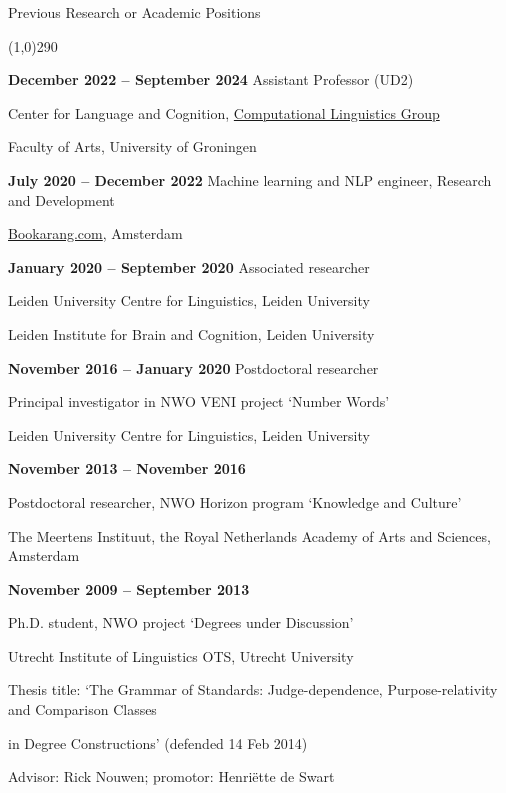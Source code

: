 \documentclass[12pt,letterpaper]{article}
\begin{document}
\noindent \Large{Previous Research or Academic Positions}

\vspace{-4mm}
\noindent\line(1,0){290}

\vspace{2mm}

\small{
\noindent\textbf{December 2022 -- September 2024}
Assistant Professor (UD2)

Center for Language and Cognition, \href{https://www.rug.nl/research/clcg/research/cl/}{Computational Linguistics Group}

Faculty of Arts, University of Groningen
}

\vspace{2mm}
\small{
\noindent\textbf{July 2020 -- December 2022}
Machine learning and NLP engineer, Research and Development

\url{Bookarang.com}, Amsterdam
}

\vspace{2mm}
\small{
\noindent\textbf{January 2020 -- September 2020}
Associated researcher

Leiden University Centre for Linguistics, Leiden University

Leiden Institute for Brain and Cognition, Leiden University
}

\vspace{2mm}
\small{
\noindent\textbf{November 2016 -- January 2020}
Postdoctoral researcher

Principal investigator in NWO VENI project `Number Words'

Leiden University Centre for Linguistics, Leiden University
}

\vspace{2mm}

\small{
\noindent\textbf{November 2013 -- November 2016}

Postdoctoral researcher, NWO Horizon program `Knowledge and Culture'

The Meertens Instituut, the Royal Netherlands Academy of Arts and Sciences, Amsterdam
}

\vspace{2mm}

\small{
\noindent\textbf{November 2009 -- September 2013}

Ph.D. student, NWO project `Degrees under Discussion'

Utrecht Institute of Linguistics OTS, Utrecht University

Thesis title: `The Grammar of Standards: Judge-dependence, Purpose-relativity and Comparison Classes 

in Degree Constructions' (defended 14 Feb 2014)

Advisor: Rick Nouwen; promotor: Henri\"{e}tte de Swart
}
\end{document}
